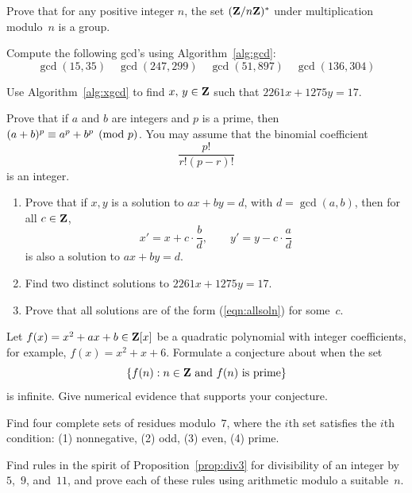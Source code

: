 \begin{exercises}
\item\label{ex:unitgroup} Prove that for any positive
integer $n$, the set $(\mathbf{Z}/n\mathbf{Z}{})^*$ under multiplication
modulo~$n$ is a group.
\item\label{ex:gcds} Compute the following gcd's using
Algorithm~\ref{alg:gcd}:
$$
  \gcd(15,35)\quad
  \gcd(247,299)\quad
  \gcd(51,897) \quad
  \gcd(136,304)
 $$


\item\label{ex:gcdrep}
Use Algorithm~\ref{alg:xgcd} to find $x,\, y\in\mathbf{Z}$
such that $2261x + 1275y = 17$.

\item  \label{ex:binomdiv}
Prove that if $a$ and $b$ are integers and $p$ is a prime,
then $(a+b)^p \equiv a^p + b^p\pmod{p}$.  You may assume
that the binomial coefficient
$$
   \frac{p!}{r!(p-r)!}
$$
is an integer.


\item\label{ex:allsoln}
\begin{enumerate}
\item Prove that if $x, y$ is a solution to
$ax + by = d$, with $d=\gcd(a,b)$,
then for all $c\in\mathbf{Z}$,
\begin{equation}\label{eqn:allsoln}
   x' = x+ c\cdot\frac{b}{d}, \qquad
   y' = y - c\cdot\frac{a}{d}
\end{equation}
is also a solution to $ax+by=d$.
\item Find two distinct solutions to $2261x + 1275y = 17$.
\item Prove that all solutions are of the form (\ref{eqn:allsoln})
for some~$c$.
\end{enumerate}

\item\label{ex:polrepconj}
 Let $f(x)=x^2+ax+b \in\mathbf{Z}[x]$ be a quadratic
polynomial with integer coefficients, for example, $f(x)=x^2+x+6$.
Formulate a conjecture about when the set
$$
\{ f(n) : n\in \mathbf{Z} \text{ and $f(n)$ is prime}\}
$$
is infinite.  Give numerical evidence
that supports your conjecture.

\item\label{ex:residues}
Find four complete sets of residues modulo~$7$, where the
$i$th set satisfies the $i$th condition:
 (1) nonnegative, (2) odd, (3) even, (4) prime.

\item\label{ex:divrules}
  Find rules in the spirit of
  Proposition~\ref{prop:div3} for divisibility of an integer
  by~$5$,~$9$, and~$11$, and prove each of these rules using
  arithmetic modulo a suitable~$n$.


\end{exercises}
